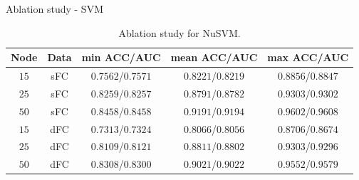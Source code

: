 \documentclass{beamer}
\begin{document}
\begin{frame}{Ablation study - SVM}
    \begin{table}[H]
        \centering
        \begin{tabular}{|c|c|c|c|c|}
            \hline
            Node & Data & min ACC/AUC       & mean ACC/AUC      & max ACC/AUC       \\
            \hline
            $15$ & sFC  & $0.7562$/$0.7571$ & $0.8221$/$0.8219$ & $0.8856$/$0.8847$ \\
            \hline
            $25$ & sFC  & $0.8259$/$0.8257$ & $0.8791$/$0.8782$ & $0.9303$/$0.9302$ \\
            \hline
            $50$ & sFC  & $0.8458$/$0.8458$ & $0.9191$/$0.9194$ & $0.9602$/$0.9608$ \\
            \hline
            $15$ & dFC  & $0.7313$/$0.7324$ & $0.8066$/$0.8056$ & $0.8706$/$0.8674$ \\
            \hline
            $25$ & dFC  & $0.8109$/$0.8121$ & $0.8811$/$0.8802$ & $0.9303$/$0.9296$ \\
            \hline
            $50$ & dFC  & $0.8308$/$0.8300$ & $0.9021$/$0.9022$ & $0.9552$/$0.9579$ \\
            \hline
        \end{tabular}
        \caption{Ablation study for NuSVM.}
    \end{table}
\end{frame}
\end{document}
